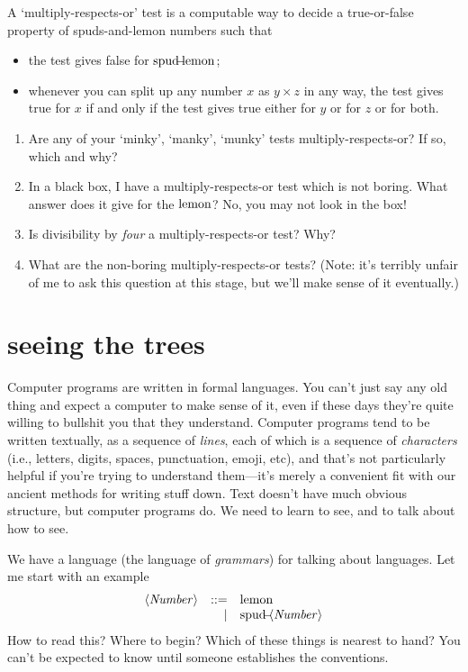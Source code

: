 \documentclass{book}
\begin{document}
\begin{puz}
  A `multiply-respects-or' test is a computable way to decide a true-or-false property of spuds-and-lemon numbers such that
  \begin{itemize}
  \item the test gives false for $\mbox{spud}\!\!\!-\!\!\!\mbox{lemon}$;
  \item whenever you can split up any number $x$ as $y\times z$ in any way, the test gives true for $x$ if and only if the test gives true either for $y$ or for $z$ or for both.
  \end{itemize}
  \begin{enumerate}
  \item Are any of your `minky', `manky', `munky' tests multiply-respects-or? If so, which and why?
  \item In a black box, I have a multiply-respects-or test which is not boring. What answer does it give for the $\mbox{lemon}$? No, you may not look in the box!
  \item Is divisibility by \emph{four} a multiply-respects-or test? Why?
  \item What are the non-boring multiply-respects-or tests? (Note: it's terribly unfair of me to ask this question at this stage, but we'll make sense of it eventually.)
  \end{enumerate}
\end{puz}


\chapter{seeing the trees}

Computer programs are written in formal languages. You can't just say any old thing and expect a computer to make sense of it, even if these days they're quite willing to bullshit you that they understand. Computer programs tend to be written textually, as a sequence of \emph{lines}, each of which is a sequence of \emph{characters} (i.e., letters, digits, spaces, punctuation, emoji, etc), and that's not particularly helpful if you're trying to understand them---it's merely a convenient fit with our ancient methods for writing stuff down. Text doesn't have much obvious structure, but computer programs do. We need to learn to see, and to talk about how to see.

We have a language (the language of \emph{grammars}) for talking about languages. Let me start with an example
\newcommand{\nt}[1]{\langle\mathit{#1}\rangle}
\[\begin{array}{rrl}
\nt{Number} & ::= & \lemon\\
            &   | & \spud\nt{Number}
\end{array}\]
How to read this? Where to begin? Which of these things is nearest to hand? You can't be expected to know until someone establishes the conventions.
\end{document}
